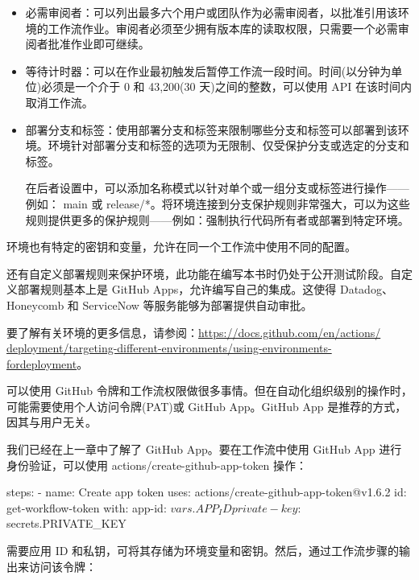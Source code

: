 \begin{itemize}
\item 
必需审阅者：可以列出最多六个用户或团队作为必需审阅者，以批准引用该环境的工作流作业。审阅者必须至少拥有版本库的读取权限，只需要一个必需审阅者批准作业即可继续。

\item 
等待计时器：可以在作业最初触发后暂停工作流一段时间。时间(以分钟为单位)必须是一个介于 0 和 43,200(30 天)之间的整数，可以使用 API 在该时间内取消工作流。

\item 
部署分支和标签：使用部署分支和标签来限制哪些分支和标签可以部署到该环境。环境针对部署分支和标签的选项为无限制、仅受保护分支或选定的分支和标签。

在后者设置中，可以添加名称模式以针对单个或一组分支或标签进行操作——例如： main 或 release/*。将环境连接到分支保护规则非常强大，可以为这些规则提供更多的保护规则——例如：强制执行代码所有者或部署到特定环境。
\end{itemize}

环境也有特定的密钥和变量，允许在同一个工作流中使用不同的配置。

还有自定义部署规则来保护环境，此功能在编写本书时仍处于公开测试阶段。自定义部署规则基本上是 GitHub Apps，允许编写自己的集成。这使得 Datadog、Honeycomb 和 ServiceNow 等服务能够为部署提供自动审批。

要了解有关环境的更多信息，请参阅：\url{https://docs.github.com/en/actions/ deployment/targeting-different-environments/using-environments-fordeployment}。


可以使用 GitHub 令牌和工作流权限做很多事情。但在自动化组织级别的操作时，可能需要使用个人访问令牌(PAT)或 GitHub App。GitHub App 是推荐的方式，因其与用户无关。

我们已经在上一章中了解了 GitHub App。要在工作流中使用 GitHub App 进行身份验证，可以使用 actions/create-github-app-token 操作：

\begin{shell}
steps:
  - name: Create app token
    uses: actions/create-github-app-token@v1.6.2
    id: get-workflow-token
    with:
      app-id: ${{ vars.APP_ID }}
      private-key: ${{ secrets.PRIVATE_KEY }}
\end{shell}

需要应用 ID 和私钥，可将其存储为环境变量和密钥。然后，通过工作流步骤的输出来访问该令牌：


